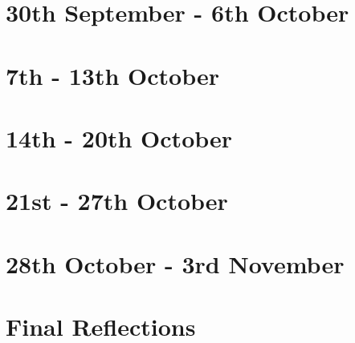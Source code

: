 \documentclass{article}
\begin{document}
\section{30th September - 6th October}

\section{7th - 13th October}

\section{14th - 20th October}

\section{21st - 27th October}

\section{28th October - 3rd November}

\section*{Final Reflections}
\end{document}
